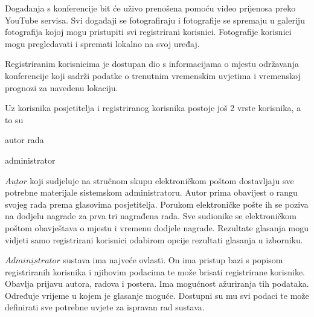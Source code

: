 		Događanja s konferencije bit će uživo prenošena pomoću video prijenosa preko YouTube servisa. Svi događaji se fotografiraju i fotografije se spremaju u galeriju fotografija kojoj mogu pristupiti svi registrirani korisnici. Fotografije korisnici mogu pregledavati i  spremati lokalno na svoj uređaj.
		
		Registriranim korisnicima je dostupan dio s informacijama o mjestu održavanja konferencije koji sadrži podatke o trenutnim vremenskim uvjetima i vremenskoj prognozi za navedenu lokaciju.
		
		Uz korisnika posjetitelja i registriranog korisnika postoje još 2 vrste korisnika, a to su
		\begin{packed_item}
			\item autor rada
			\item administrator
		\end{packed_item}
		
		$\underline{Autor}$ koji sudjeluje na stručnom skupu elektroničkom poštom dostavljaju sve potrebne materijale sistemskom administratoru. Autor prima obavijest o rangu svojeg rada prema glasovima posjetitelja. Porukom elektroničke pošte ih se poziva na dodjelu nagrade za prva tri nagrađena rada. Sve sudionike se elektroničkom poštom obavještava o mjestu i vremenu dodjele nagrade. Rezultate glasanja mogu vidjeti samo registrirani korisnici odabirom opcije rezultati glasanja u izborniku.
		
		$\underline{Administrator}$ sustava ima najveće ovlasti. On ima pristup bazi s popisom registriranih korisnika i njihovim podacima te može brisati registrirane korisnike. Obavlja prijavu autora, radova i postera. Ima mogućnost ažuriranja tih podataka. Određuje vrijeme u kojem je glasanje moguće. Dostupni su mu svi podaci te može definirati sve potrebne uvjete za ispravan rad sustava.

		\eject
		
